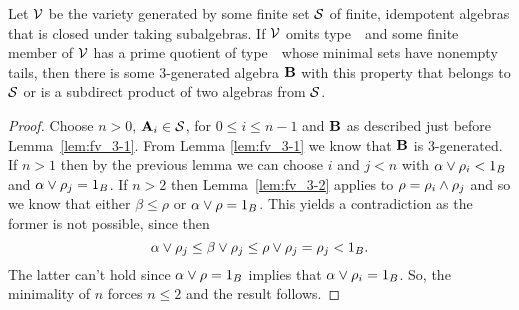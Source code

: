 \documentclass{ws-ijac}
\begin{document}
\begin{theorem}\label{thm:fv_3-4}
Let $\mathcal{V}$ be the variety generated by some finite set $\mathcal{S}$ of finite,
idempotent algebras that is closed under taking subalgebras. If\/ $\mathcal{V}$
omits type~\utyp\ and some finite member of $\mathcal{V}$ has a prime quotient
of type~\atyp\
whose minimal sets have nonempty tails, then there is some
3-generated algebra $\mathbf{B}$ with this property that belongs to $\mathcal{S}$ or is a subdirect
product of two algebras from $\mathcal{S}$.
\end{theorem}
\begin{proof}
Choose $n > 0$, $\mathbf{A}_i \in \mathcal{S}$, for $0 \le i \le n-1$ and $\mathbf{B}$
as described just before Lemma~\ref{lem:fv_3-1}. From Lemma \ref{lem:fv_3-1} we know that $\mathbf{B}$ is
3-generated. If $n > 1$ then by the previous lemma we can choose $i$
and $j < n$ with $\alpha \join \rho_i < 1_B$ and $\alpha \join \rho_j =
1_B$. If $n > 2$ then Lemma~\ref{lem:fv_3-2} applies to $\rho = \rho_i
\meet \rho_j$ and so we know that either $\beta \le \rho$ or $\alpha
\join \rho = 1_B$. This yields a contradiction as the former is not
possible, since then
\[
\alpha \join \rho_j \le \beta \join \rho_j \le \rho \join \rho_j = \rho_j < 1_B.
\]%
The latter can't hold
since  $\alpha \join \rho  = 1_B$ implies that $\alpha \join \rho_i = 1_B$.
So, the minimality of $n$ forces $n\le 2$ and the result follows.
\end{proof}
\end{document}

